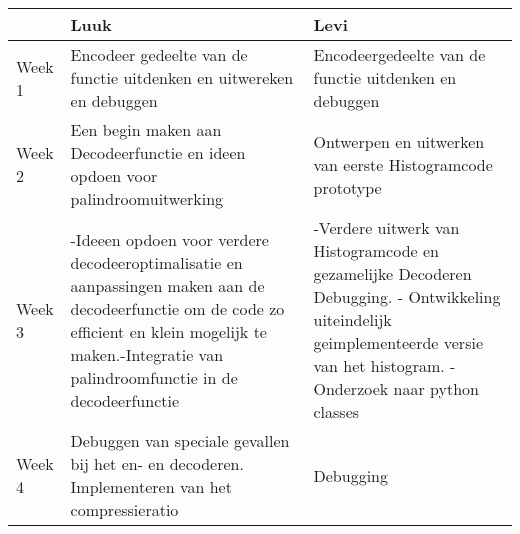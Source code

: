\documentclass{article}
\begin{document}
\begin{tabular}{ l | p{6cm} p{6cm} }
   & Luuk & Levi \\
  \hline
  Week 1 & Encodeer gedeelte van de functie uitdenken en uitwereken en debuggen & Encodeergedeelte van de functie uitdenken en debuggen \\
  Week 2 & Een begin maken aan Decodeerfunctie en ideen opdoen voor palindroomuitwerking & Ontwerpen en uitwerken van eerste Histogramcode prototype \\
  Week 3 & -Ideeen opdoen voor verdere decodeeroptimalisatie en aanpassingen maken aan de decodeerfunctie om de code zo efficient en klein mogelijk te maken.\linebreak -Integratie van palindroomfunctie in de decodeerfunctie & -Verdere uitwerk van Histogramcode en gezamelijke Decoderen Debugging. \linebreak - Ontwikkeling uiteindelijk geimplementeerde versie van het histogram.  \linebreak  - Onderzoek naar python classes \\
  Week 4  & Debuggen van speciale gevallen bij het en- en decoderen. Implementeren van het compressieratio & Debugging \\
 
  
\end{tabular}
\end{document}
